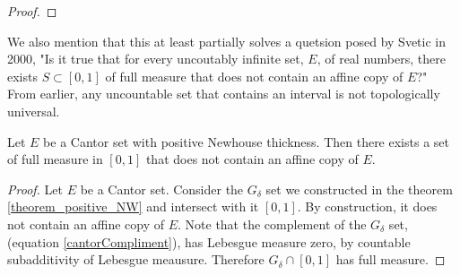 \begin{proof}

\end{proof}

We also mention that this at least partially solves a quetsion posed by Svetic\cite{Svetic} in 2000, "Is it true that for every uncoutably infinite set, $E$, of real numbers, there exists $S \subset [0,1]$ of full measure that does not contain an affine copy of $E$?"  From earlier, any uncountable set that contains an interval is not topologically universal. 
\begin{theorem}
    Let $E$ be a Cantor set with positive Newhouse thickness.  Then there exists a set of full measure in $[0,1]$ that does not contain an affine copy of $E$. 
\end{theorem}
\begin{proof}
    Let $E$ be a Cantor set. Consider the $G_{\delta}$ set we constructed in the theorem \ref{theorem_positive_NW} and intersect with it $[0,1]$.  By construction, it does not contain an affine copy of $E$.   Note that the complement of the $G_\delta$ set, (equation \ref{cantorCompliment}), has Lebesgue measure zero, by countable subadditivity of Lebesgue meausure.  Therefore $G_\delta \cap [0,1]$ has full measure.
\end{proof}




